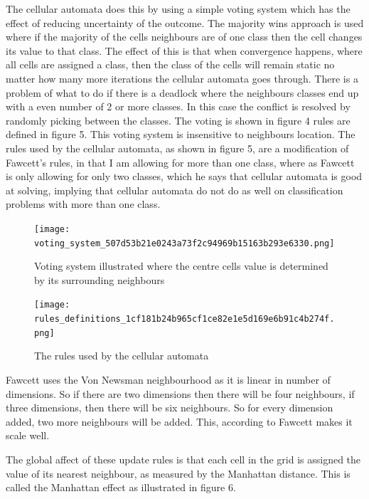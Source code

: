 \documentclass[11pt]{article}
\begin{document}
The cellular automata does this by using a simple voting system which
has the effect of reducing uncertainty of the outcome. The majority
wins approach is used where if the majority of the cells neighbours
are of one class then the cell changes its value to that class.  The
effect of this is that when convergence happens, where all cells are
assigned a class, then the class of the cells will remain static no
matter how many more iterations the cellular automata goes through.
There is a problem of what to do if there is a deadlock where the
neighbours classes end up with a even number of 2 or more classes.  In
this case the conflict is resolved by randomly picking between the
classes. The voting is shown in figure 4 rules are defined in
figure 5. This voting system is insensitive to neighbours location.
The rules used by the cellular automata, as shown in figure 5, are a
modification of Fawcett's \cite{fawcett08} rules, in that I am
allowing for more than one class, where as Fawcett \cite{fawcett08} is
only allowing for only two classes, which he says that cellular
automata is good at solving, implying that cellular automata do not do
as well on classification problems with more than one class.

\begin{figure}[htb]
\centering
\texttt{[image: voting\_system\_507d53b21e0243a73f2c94969b15163b293e6330.png]}
\caption{Voting system illustrated where the centre cells value is determined by its surrounding neighbours}
\end{figure}


\begin{figure}[htb]
\centering
\texttt{[image: rules\_definitions\_1cf181b24b965cf1ce82e1e5d169e6b91c4b274f.png]}
\caption{The rules used by the cellular automata}
\end{figure}



Fawcett \cite{fawcett08} uses the Von Newsman neighbourhood as it is
linear in number of dimensions. So if there are two dimensions then
there will be four neighbours,  if three dimensions, then there will
be six neighbours.  So for every dimension added, two more neighbours
will be added.  This, according to Fawcett \cite{fawcett08} makes it
scale well.

The global affect of these update rules is that each cell in the grid
is assigned the value of its nearest neighbour, as measured by the
Manhattan distance.  This is called the Manhattan effect as
illustrated in figure 6.
\end{document}
